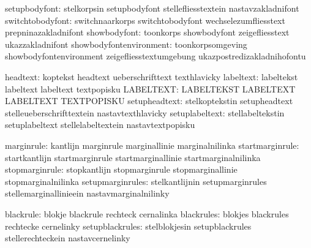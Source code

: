                 setupbodyfont:  stelkorpsin                  setupbodyfont
                                stellefliesstextein          nastavzakladnifont
             switchtobodyfont:  switchnaarkorps              switchtobodyfont
                                wechselezumfliesstext        prepninazakladnifont
                 showbodyfont:  toonkorps                    showbodyfont
                                zeigefliesstext              ukazzakladnifont
      showbodyfontenvironment:  toonkorpsomgeving            showbodyfontenvironment
                                zeigefliesstextumgebung       ukazpostredizakladnihofontu

                     headtext:  koptekst                     headtext
                                ueberschrifttext             texthlavicky
                    labeltext:  labeltekst                   labeltext
                                labeltext                    textpopisku
                    LABELTEXT:  LABELTEKST                   LABELTEXT
                                LABELTEXT                    TEXTPOPISKU
                setupheadtext:  stelkoptekstin               setupheadtext
                                stelleueberschrifttextein    nastavtexthlavicky
               setuplabeltext:  stellabeltekstin             setuplabeltext
                                stellelabeltextein           nastavtextpopisku

                   marginrule:  kantlijn                     marginrule
                                marginallinie                marginalnilinka
              startmarginrule:  startkantlijn                startmarginrule
                                startmarginallinie           startmarginalnilinka
               stopmarginrule:  stopkantlijn                 stopmarginrule
                                stopmarginallinie            stopmarginalnilinka
             setupmarginrules:  stelkantlijnin               setupmarginrules
                                stellemarginallinieein       nastavmarginalnilinky

                    blackrule:  blokje                       blackrule
                                rechteck                     cernalinka
                   blackrules:  blokjes                      blackrules
                                rechtecke                    cernelinky
              setupblackrules:  stelblokjesin                setupblackrules
                                stellerechteckein            nastavcernelinky

